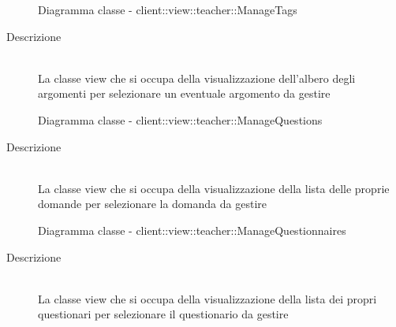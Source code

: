 \vspace{0.5cm}
\hypertarget{client::view::teacher::ManageTags}{}
\begin{figure}[H]
	\centering
	\caption{Diagramma classe - client::view::teacher::ManageTags}
\end{figure}\begin{description}
\item[Descrizione] \hfill \\
La classe view che si occupa della visualizzazione dell'albero degli argomenti per selezionare un eventuale argomento da gestire
\end{description}

\vspace{0.5cm}
\hypertarget{client::view::teacher::ManageQuestions}{}
\begin{figure}[H]
	\centering
	\caption{Diagramma classe - client::view::teacher::ManageQuestions}
\end{figure}\begin{description}
\item[Descrizione] \hfill \\
La classe view che si occupa della visualizzazione della lista delle proprie domande per selezionare la domanda da gestire
\end{description}

\vspace{0.5cm}
\hypertarget{client::view::teacher::ManageQuestionnaires}{}
\begin{figure}[H]
	\centering
	\caption{Diagramma classe - client::view::teacher::ManageQuestionnaires}
\end{figure}\begin{description}
\item[Descrizione] \hfill \\
La classe view che si occupa della visualizzazione della lista dei propri questionari per selezionare il questionario da gestire
\end{description}

